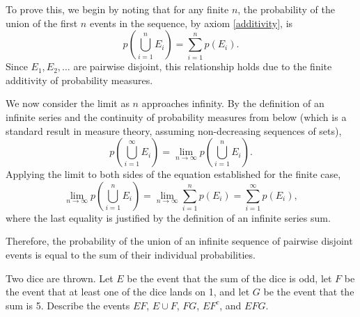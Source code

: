         \begin{solution}
            To prove this, we begin by noting that for any finite \(n\), the probability of the union of the first \(n\) events in the sequence, by axiom \ref{additivity}, is
            \[
                p\left(\bigcup_{i=1}^n E_i\right) = \sum_{i=1}^n p(E_i).
            \]
            Since \(E_1, E_2, \ldots\) are pairwise disjoint, this relationship holds due to the finite additivity of probability measures.
        
            We now consider the limit as \(n\) approaches infinity. By the definition of an infinite series and the continuity of probability measures from below (which is a standard result in measure theory, assuming non-decreasing sequences of sets),
            \[
                p\left(\bigcup_{i=1}^\infty E_i\right) = \lim_{n \to \infty} p\left(\bigcup_{i=1}^n E_i\right).
            \]
            Applying the limit to both sides of the equation established for the finite case,
            \[
                \lim_{n \to \infty} p\left(\bigcup_{i=1}^n E_i\right) = \lim_{n \to \infty} \sum_{i=1}^n p(E_i) = \sum_{i=1}^\infty p(E_i),
            \]
            where the last equality is justified by the definition of an infinite series sum.
        
            Therefore, the probability of the union of an infinite sequence of pairwise disjoint events is equal to the sum of their individual probabilities.
        \end{solution}

        \begin{exercise}
            Two dice are thrown. Let \(E\) be the event that the sum of the dice is odd, let \(F\) be the event that at least one of the dice lands on 1, and let \(G\) be the event that the sum is 5. Describe the events \(EF\), \(E \cup F\), \(FG\), \(EF^c\), and \(EFG\).
        \end{exercise}
        
